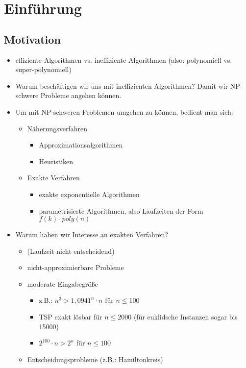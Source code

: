 \chapter{Einführung}

  \section{Motivation}
  \begin{itemize}
   \item effiziente Algorithmen vs. ineffiziente Algorithmen (also: polynomiell vs. super-polynomiell)
   \item Warum beschäftigen wir uns mit ineffizienten Algorithmen? Damit wir NP-schwere Probleme angehen können.
   \item Um mit NP-schweren Problemen umgehen zu können, bedient man sich:
   \begin{itemize}
    \item Näherungsverfahren
    \begin{itemize}
     \item Approximationsalgorithmen
     \item Heuristiken
    \end{itemize}
    \item Exakte Verfahren
    \begin{itemize}
     \item exakte exponentielle Algorithmen
     \item parametrisierte Algorithmen, also Laufzeiten der Form $f(k)\cdot poly(n)$
    \end{itemize}
   \end{itemize}
   \item Warum haben wir Interesse an exakten Verfahren?
   \begin{itemize}
    \item (Laufzeit nicht entscheidend)
    \item nicht-approximierbare Probleme
    \item moderate Eingabegröße
    \begin{itemize}
     \item z.B.: $n^3 > 1,0941^n \cdot n$ für $n \leq 100$
     \item TSP exakt lösbar für $n\leq 2000$ (für euklidsche Instanzen sogar bis 15000)
     \item $2^{100}\cdot n > 2^n$ für $n \leq 100$
    \end{itemize}
    \item Entscheidungsprobleme (z.B.: Hamiltonkreis)

\end{itemize}
\end{itemize}
